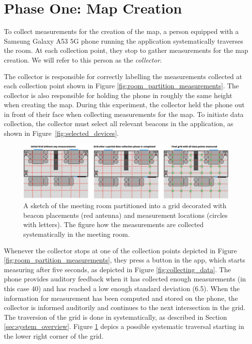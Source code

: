 \section{Phase One: Map Creation}\label{sec:eval_phase1}
To collect measurements for the creation of the map, a person equipped with a Samsung Galaxy A53 5G phone running the application systematically traverses the room. 
At each collection point, they stop to gather measurements for the map creation.
We will refer to this person as the \textit{collector}.

The collector is responsible for correctly labelling the measurements collected at each collection point shown in Figure \ref{fig:room_partition_measurements}. 
The collector is also responsible for holding the phone in roughly the same height when creating the map. 
During this experiment, the collector held the phone out in front of their face when collecting measurements for the map.
To initiate data collection, the collector must select all relevant beacons in the application, as shown in Figure~\ref{fig:selected_devices}.

\begin{figure}[h]
    \centering
    \includegraphics[width=\textwidth]{images/experiment_map_creation.png}
    \caption{A sketch of the meeting room partitioned into a grid decorated with beacon placements (red antenna) and measurement locations (circles with letters). The figure how the measurements are collected systematically in the meeting room.}
    \label{fig:experiment_map_creation}
\end{figure}
Whenever the collector stops at one of the collection points depicted in Figure \ref{fig:room_partition_measurements}, they press a button in the app, which starts measuring after five seconds, as depicted in Figure \ref{fig:collecting_data}.
The phone provides auditory feedback when it has collected enough measurements (in this case 40) and has reached a low enough standard deviation (6.5).
When the information for measurement has been computed and stored on the phone, the collector is informed auditorily and continues to the next intersection in the grid. 
The traversion of the grid is done in systematically, as described in Section \ref{sec:system_overview}. 
Figure \ref{fig:experiment_map_creation} depics a possible systematic traversal starting in the lower right corner of the grid. 


